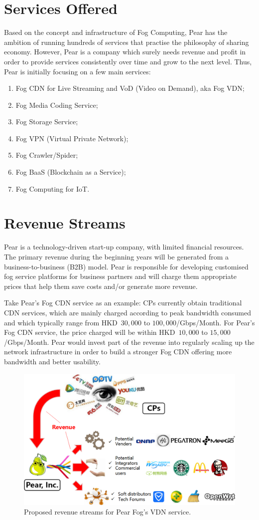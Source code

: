 \section{Services Offered}
Based on the concept and infrastructure of Fog Computing, Pear has the ambition of running hundreds of services that practise the philosophy of sharing economy. However, Pear is a company which surely needs revenue and profit in order to provide services consistently over time and grow to the next level. Thus, Pear is initially focusing on a few main services: 
\begin{enumerate}
	\item Fog CDN for Live Streaming and VoD (Video on Demand), aka Fog VDN;
	\item Fog Media Coding Service;
	\item Fog Storage Service;
	\item Fog VPN (Virtual Private Network);
	\item Fog Crawler/Spider;
	\item Fog BaaS (Blockchain as a Service);
	\item Fog Computing for IoT.
\end{enumerate}

\section{Revenue Streams}
Pear is a technology-driven start-up company, with limited financial resources. The primary revenue during the beginning years will be generated from a business-to-business (B2B) model. Pear is responsible for developing customised fog service platforms for business partners and will charge them appropriate prices that help them save costs and/or generate more revenue. 

Take Pear's Fog CDN service as an example: CPs currently obtain traditional CDN services, which are mainly charged according to peak bandwidth consumed and which typically range from HKD~$30,000$ to $100,000$/Gbps/Month. For Pear's Fog CDN service, the price charged will be within HKD~$10,000$ to $15,000$/Gbps/Month. Pear would invest part of the revenue into regularly scaling up the network infrastructure in order to build a stronger Fog CDN offering more bandwidth and better usability. 

\begin{figure}[ht]
	\centering
	\includegraphics[width=.80\textwidth]{fig/biz/revenue_stream.png}
	\caption{Proposed revenue streams for Pear Fog's VDN service.} \label{fig:vdn-revenue-stream}
\end{figure}

